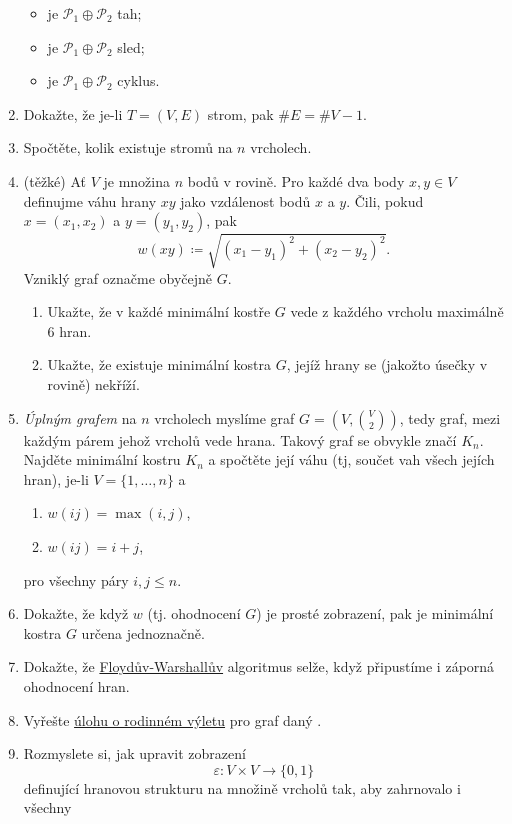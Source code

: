\begin{enumerate}
\begin{itemize}
   \item je $\mathcal{P}_1 \oplus \mathcal{P}_2$ tah;
   \item je $\mathcal{P}_1 \oplus \mathcal{P}_2$ sled;
   \item je $\mathcal{P}_1 \oplus \mathcal{P}_2$ cyklus.
  \end{itemize}
 \item Dokažte, že je-li $T = (V,E)$ strom, pak $\# E = \# V - 1$.
 \item Spočtěte, kolik existuje stromů na $n$ vrcholech.
 \item (těžké) Ať $V$ je množina $n$ bodů v rovině. Pro každé dva body $x,y \in
  V$ definujme váhu hrany $xy$ jako vzdálenost bodů $x$ a $y$. Čili, pokud $x =
  (x_1,x_2)$ a $y = (y_1,y_2)$, pak
  \[
   w(xy) \coloneqq \sqrt{(x_1 - y_1)^2 + (x_2 - y_2)^2}.
  \]
  Vzniklý graf označme obyčejně $G$.
  \begin{enumerate}[label=(\alph*)]
   \item Ukažte, že v každé minimální kostře $G$ vede z každého vrcholu maximálně
    6 hran.
   \item Ukažte, že existuje minimální kostra $G$, jejíž hrany se (jakožto úsečky
    v rovině) nekříží.
  \end{enumerate}
 \item \emph{Úplným grafem} na $n$ vrcholech myslíme graf $G = (V,
  \binom{V}{2})$, tedy graf, mezi každým párem jehož vrcholů vede hrana. Takový
  graf se obvykle značí $K_n$. Najděte minimální kostru $K_n$ a spočtěte její
  váhu (tj, součet vah všech jejích hran), je-li $V = \{1,\ldots,n\}$ a
  \begin{enumerate}[label=(\alph*)]
   \item $w(ij) = \max(i,j)$,
   \item $w(ij) = i + j$,
  \end{enumerate}
  pro všechny páry $i,j \leq n$.
 \item Dokažte, že když $w$ (tj. ohodnocení $G$) je prosté zobrazení, pak je
  minimální kostra $G$ určena jednoznačně.
 \item Dokažte, že \hyperref[alg:floyd-warshall]{Floydův-Warshallův} algoritmus
  selže, když připustíme i záporná ohodnocení hran.
 \item Vyřešte \hyperref[prob:rodinny-vylet]{úlohu o rodinném výletu} pro graf
  daný .
 \item Rozmyslete si, jak upravit zobrazení
  \[
   \varepsilon:V \times V \to \{0,1\}
  \]
  definující hranovou strukturu na množině vrcholů tak, aby zahrnovalo i všechny

\end{enumerate}
